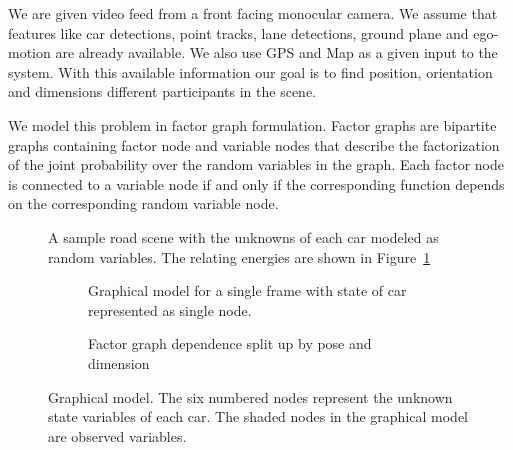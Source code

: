 We are given video feed from a front facing monocular camera. We assume that features like car detections, point tracks, lane detections, ground plane and ego-motion are already available. We also use GPS and Map as a given input to the system. With this available information our goal is to find position, orientation and dimensions different participants in the scene.

We model this problem in factor graph formulation. Factor graphs are bipartite graphs containing factor node and variable nodes that describe the factorization of the joint probability over the random variables in the graph. Each factor node is connected to a variable node if and only if the corresponding function depends on the corresponding random variable node.

\begin{figure}
  \centering
  \newcommand{\imagewidth}{\textwidth}
  
  \caption{A sample road scene with the unknowns of each car modeled as random variables. 
  The relating energies are shown in Figure~\ref{fig:graphmodel}}
\end{figure}
\begin{figure}
  \begin{subfigure}[b]{0.55\textwidth}
    
    \caption{Graphical model for a single frame with state of car represented
    as single node.}
  \end{subfigure}
  \begin{subfigure}[b]{0.45\textwidth}
    \tikzset{/tikz/x=0.8cm,/tikz/y=0.8cm}
    
    \caption{Factor graph dependence split up by pose and dimension}
  \end{subfigure}
\caption{Graphical model. The six numbered nodes represent the unknown state variables of each car. The shaded nodes in the graphical model are observed variables. %
}
  \label{fig:graphmodel}
\end{figure}
